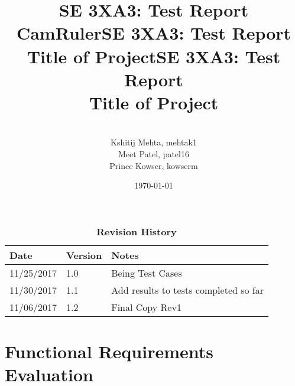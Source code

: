 \documentclass[12pt, titlepage]{article}
\title{SE 3XA3: Test Report\\CamRuler}
\title{SE 3XA3: Test Report\\Title of Project}
\title{SE 3XA3: Test Report\\Title of Project}
\author{
		\\ Kshitij Mehta, mehtak1
		\\ Meet Patel, patel16
		\\ Prince Kowser, kowserm
}
\date{\today}
\begin{document}
\maketitle

\tableofcontents
\listoftables
\listoffigures

\begin{table}[bp]
\caption{\bf Revision History}
\begin{tabularx}{\textwidth}{p{3cm}p{2cm}X}
\toprule {\bf Date} & {\bf Version} & {\bf Notes}\\
\midrule
11/25/2017 & 1.0 & Being Test Cases\\
11/30/2017 & 1.1 & Add results to tests completed so far\\
11/06/2017 & 1.2 & Final Copy Rev1\\
\bottomrule
\end{tabularx}
\end{table}

\newpage


\section{Functional Requirements Evaluation}
\end{document}
